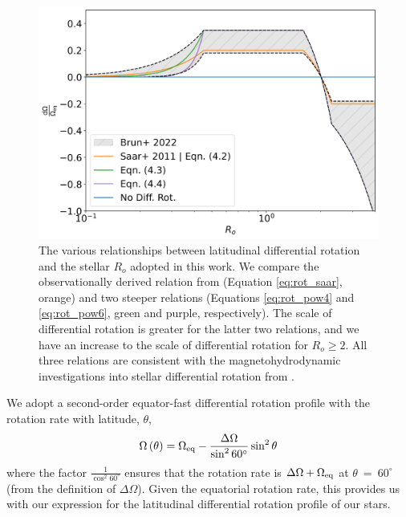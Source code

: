 \begin{figure}
\centering
 \includegraphics[width=\textwidth]{Figures/rot_gap_figures/comparison_diffrot.png}
 \caption[The various relationships between latitudinal differential rotation and the stellar $R_o$ adopted in this work.]{
 	The various relationships between latitudinal differential rotation and the stellar $R_o$ adopted in this work. We compare the observationally derived relation from \citet{saar_starspots_2011} (Equation \ref{eq:rot_saar}, orange) and two steeper relations (Equations \ref{eq:rot_pow4} and \ref{eq:rot_pow6}, green and purple, respectively). The scale of differential rotation is greater for the latter two relations, and we have an increase to the scale of differential rotation for $R_o\geq2$. All three relations are consistent with the magnetohydrodynamic investigations into stellar differential rotation from \citet{brun_powering_2022}.
}
 \label{fig:compar_diffrot}
\end{figure}

We adopt a second-order equator-fast differential rotation profile with the rotation rate with latitude, $\theta$,
\begin{equation}
  \label{eq:obs_eq}
  \Omega\left(\theta\right) = \Omega_{\rm{eq}} - \frac{\Delta \Omega}{\sin^2 60^{\circ}} \sin^2{\theta}
\end{equation}
where the factor $\frac{1}{\cos^2{60^{\circ}}}$ ensures that the rotation rate is $\Delta \Omega + \Omega_{\rm{eq}}$ at $\theta \ = \ 60^{\circ}$ (from the definition of $\Delta \Omega$).
Given the equatorial rotation rate, this provides us with our expression for the latitudinal differential rotation profile of our stars.

